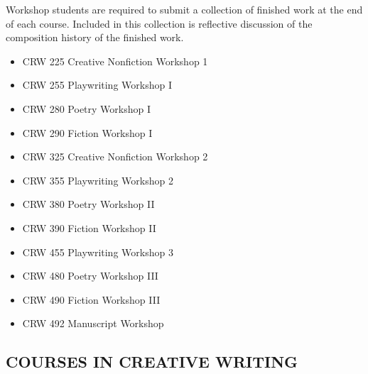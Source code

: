 \documentclass[
  letterpaper,
]{scrbook}
\providecommand{\tightlist}{%
  \setlength{\itemsep}{0pt}\setlength{\parskip}{0pt}}
\begin{document}
Workshop students are required to submit a collection of finished work
at the end of each course. Included in this collection is reflective
discussion of the composition history of the finished work.

\begin{itemize}
\tightlist
\item
  CRW 225 Creative Nonfiction Workshop 1\\
\item
  CRW 255 Playwriting Workshop I\\
\item
  CRW 280 Poetry Workshop I\\
\item
  CRW 290 Fiction Workshop I\\
\item
  CRW 325 Creative Nonfiction Workshop 2\\
\item
  CRW 355 Playwriting Workshop 2\\
\item
  CRW 380 Poetry Workshop II\\
\item
  CRW 390 Fiction Workshop II\\
\item
  CRW 455 Playwriting Workshop 3\\
\item
  CRW 480 Poetry Workshop III\\
\item
  CRW 490 Fiction Workshop III\\
\item
  CRW 492 Manuscript Workshop
\end{itemize}

\subsection{COURSES IN CREATIVE
WRITING}\label{sec-courses-in-creative-writing}
\end{document}
